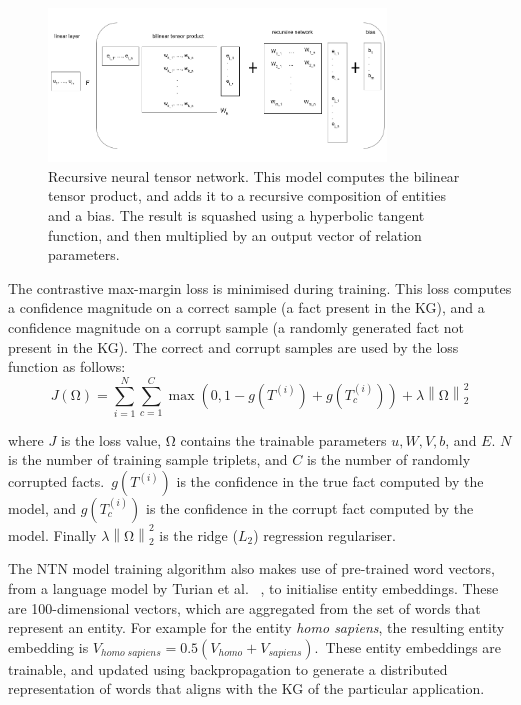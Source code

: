 \begin{figure}[H]
   	\centering
    	\includegraphics[width=0.8\textwidth, height=0.4\textwidth]{recursive_neural_tensor_network.png}
	\captionsetup{justification=centering}
	\caption{Recursive neural tensor network. This model computes the bilinear tensor product, and adds it to a recursive composition of entities and a bias. The result is squashed using a hyperbolic tangent function, and then multiplied by an output vector of relation parameters.}
\end{figure}

\noindent The contrastive max-margin loss is minimised during training. This loss computes a confidence magnitude on a correct sample (a fact present in the KG), and a confidence magnitude on a corrupt sample (a randomly generated fact not present in the KG). The correct and corrupt samples are used by the loss function as follows:
\begin{equation}
	J(\si{\ohm}) =  \sum_{i=1}^N \sum_{c=1}^C \max(0,1 - g(T^{(i)}) + g(T_c^{(i)})) + \lambda \left \lVert \si{\ohm} \right \rVert_2^2
\end{equation}

\noindent where $J$ is the loss value, $\si{\ohm}$ contains the trainable parameters $u, W, V, b $, and $ E $. $N$ is the number of training sample triplets, and $ C $ is the number of randomly corrupted facts.\ $ g(T^{(i)}) $ is the confidence in the true fact computed by the model, and $ g(T_c^{(i)}) $ is the confidence in the corrupt fact computed by the model. Finally $\lambda\left\lVert \si{\ohm} \right\rVert_2^2$ is the ridge ($L_2$) regression regulariser. \par

\noindent The NTN model training algorithm also makes use of pre-trained word vectors, from a language model by Turian et al. \unskip ~\citep{turian2010word}, to initialise entity embeddings. These are 100-dimensional vectors, which are aggregated from the set of words that represent an entity. For example for the entity \textit{homo sapiens}, the resulting entity embedding is $V_{homo \; sapiens} = 0.5(V_{homo} + V_{sapiens})$.\ These entity embeddings are trainable, and updated using backpropagation to generate a distributed representation of words that aligns with the KG of the particular application. \par

